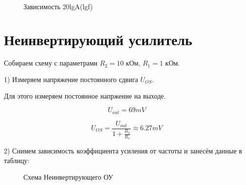 \documentclass[15pt,a5paper,reqno]{article}
\begin{document}
    \begin {figure}[h!]
      \\
      \caption{Зависимость 20lgA(lgf)}
      \label {fig:image3}
    \end {figure}


\section{Неинвертирующий усилитель}

Собираем схему с параметрами $R_2 = 10$ кОм, $R_1 = 1$ кОм.

1) Измеряем напряжение постоянного сдвига $U_{OS}$. 

Для этого измеряем постоянное напржение на выходе.

\[ U_{out} = 69 mV \]

\[  U_{OS} = \frac{U_{out}}{1 + \frac{R_2}{R_1}} \approx 6.27 mV \]


2) Снимем зависимость коэффициента усиления от частоты и занесём данные в таблицу:

\begin {figure}[h!]
      \caption{Схема Неинвертирующего ОУ}      
      \label {fig:image1}
\end {figure}
\end{document}
